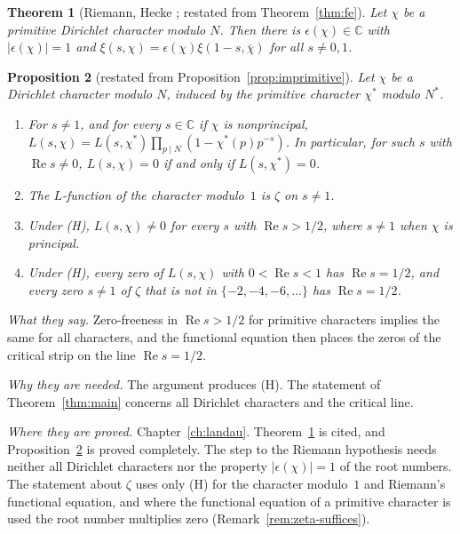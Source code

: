 \documentclass[11pt]{amsbook}
\theoremstyle{plain}
\newtheorem{theorem}{Theorem}[section]
\newtheorem{proposition}[theorem]{Proposition}
\theoremstyle{definition}
\theoremstyle{remark}
\numberwithin{equation}{section}
\numberwithin{figure}{chapter}
\numberwithin{table}{chapter}
\renewcommand{\C}{\mathbb{C}}
\begin{document}
\begin{theorem}[Riemann, Hecke \cite{Davenport2000,Riemann1859};
restated from Theorem~\ref{thm:fe}]
\label{bb:fe}
Let $\chi$ be a primitive Dirichlet character modulo $N$. Then there is
$\epsilon(\chi)\in\C$ with $|\epsilon(\chi)|=1$ and
$\xi(s,\chi)=\epsilon(\chi)\xi(1-s,\overline\chi)$ for all $s\ne0,1$.
\end{theorem}

\begin{proposition}[restated from Proposition~\ref{prop:imprimitive}]
\label{bb:imprimitive}
Let $\chi$ be a Dirichlet character modulo $N$, induced by the
primitive character $\chi^*$ modulo $N^*$.
\begin{enumerate}[label=(\alph*)]
\item For $s\ne1$, and for every $s\in\C$ if
$\chi$ is nonprincipal,
$L(s,\chi)=L(s,\chi^*)\prod_{p\mid N}(1-\chi^*(p)p^{-s})$. In
particular, for such $s$ with $\operatorname{Re}s\ne0$, $L(s,\chi)=0$
if and only if $L(s,\chi^*)=0$.
\item The $L$-function of the character
modulo~$1$ is $\zeta$ on $s\ne1$.
\item Under (H), $L(s,\chi)\ne0$ for every $s$
with $\operatorname{Re}s>1/2$, where $s\ne1$ when $\chi$ is
principal.
\item Under (H), every zero of $L(s,\chi)$
with $0<\operatorname{Re}s<1$ has $\operatorname{Re}s=1/2$, and every
zero $s\ne1$ of $\zeta$ that is not in $\{-2,-4,-6,\dots\}$ has
$\operatorname{Re}s=1/2$.
\end{enumerate}
\end{proposition}

\noindent\emph{What they say.} Zero-freeness in
$\operatorname{Re}s>1/2$ for primitive characters implies the same
for all characters, and the functional equation then places the
zeros of the critical strip on the line $\operatorname{Re}s=1/2$.

\noindent\emph{Why they are needed.} The argument produces (H). The
statement of Theorem~\ref{thm:main} concerns all Dirichlet characters
and the critical line.

\noindent\emph{Where they are proved.} Chapter~\ref{ch:landau}.
Theorem~\ref{bb:fe} is cited, and
Proposition~\ref{bb:imprimitive} is proved completely. The step to
the Riemann hypothesis needs neither all Dirichlet characters nor
the property $|\epsilon(\chi)|=1$ of the root numbers. The statement
about $\zeta$ uses only (H) for the character modulo~$1$ and
Riemann's functional equation, and where the
functional equation of a primitive character is used the root number
multiplies zero (Remark~\ref{rem:zeta-suffices}).
\end{document}
